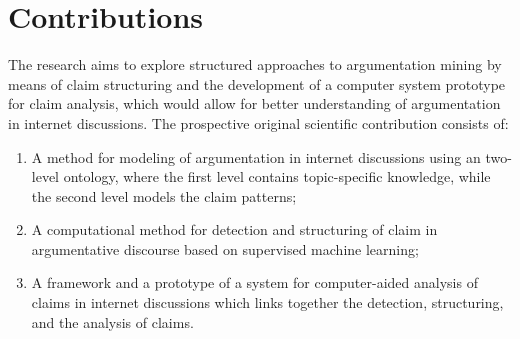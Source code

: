 % 

\section{Contributions}

The research aims to explore structured approaches to
argumentation mining by means of claim structuring and the
development of a computer system prototype for claim analysis, which would
allow for better understanding of argumentation in internet discussions. 
The prospective original scientific contribution consists of: 
\begin{enumerate}
\item A method for modeling of argumentation in internet discussions using an
two-level ontology, where the first level contains topic-specific knowledge,
while the second level models the claim patterns;
\item A computational method for detection and
structuring of claim in argumentative discourse based on supervised machine
learning;
\item A framework and a prototype of a system for computer-aided
analysis of claims in internet discussions which links together the detection,
structuring, and the analysis of claims.  
\end{enumerate}

